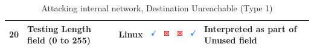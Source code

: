 \documentclass[12pt]{article}
\begin{document}
\begin{savenotes}
\begin{table}[!h]
{{\begin{tabular}{|C{1.0cm}|L{6.0cm}|C{1.5cm}|C{1.0cm}|C{1.0cm}|C{1.0cm}|C{1.0cm}|L{7.0cm}|}
20&Testing Length field (0 to 255)&Linux&\includegraphics[width=4mm, height=4mm]{ok}&\includegraphics[width=4mm, height=4mm]{notok}&\includegraphics[width=4mm, height=4mm]{notok}&\includegraphics[width=4mm, height=4mm]{ok}&Interpreted as part of Unused field\\
\hline
\end{tabular}}}
\caption{Attacking internal network, Destination Unreachable (Type 1)}
\label{table:attackInternalResults1}
\end{table}
\end{savenotes}
\end{document}
